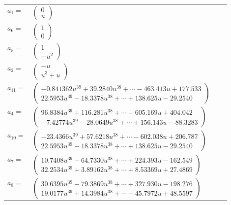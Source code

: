 \documentclass[1p]{elsarticle_modified}
\theoremstyle{definition}
\begin{document}
\begin{tabular}{m{7pt} m{180pt} m{7pt} m{180pt} }
\flushright $a_{1}=$&$\begin{pmatrix}0\\u\end{pmatrix}$ \\
\flushright $a_{6}=$&$\begin{pmatrix}1\\0\end{pmatrix}$ \\
\flushright $a_{5}=$&$\begin{pmatrix}1\\- u^2\end{pmatrix}$ \\
\flushright $a_{2}=$&$\begin{pmatrix}- u\\u^3+u\end{pmatrix}$ \\
\flushright $a_{11}=$&$\begin{pmatrix}-0.841362 u^{39}+39.2840 u^{38}+\cdots-463.413 u+177.533\\22.5953 u^{39}-18.3378 u^{38}+\cdots+138.625 u-29.2540\end{pmatrix}$ \\
\flushright $a_{4}=$&$\begin{pmatrix}96.8384 u^{39}+116.281 u^{38}+\cdots-605.169 u+404.042\\-7.42774 u^{39}-28.0649 u^{38}+\cdots+156.143 u-88.3283\end{pmatrix}$ \\
\flushright $a_{10}=$&$\begin{pmatrix}-23.4366 u^{39}+57.6218 u^{38}+\cdots-602.038 u+206.787\\22.5953 u^{39}-18.3378 u^{38}+\cdots+138.625 u-29.2540\end{pmatrix}$ \\
\flushright $a_{7}=$&$\begin{pmatrix}10.7408 u^{39}-64.7330 u^{38}+\cdots+224.393 u-162.549\\32.2534 u^{39}+3.89162 u^{38}+\cdots+8.53369 u+27.4869\end{pmatrix}$ \\
\flushright $a_{8}=$&$\begin{pmatrix}30.6395 u^{39}-79.3869 u^{38}+\cdots+327.930 u-198.276\\19.0177 u^{39}+14.3984 u^{38}+\cdots-45.7972 u+48.5597\end{pmatrix}$ \\

\end{tabular}
\end{document}

